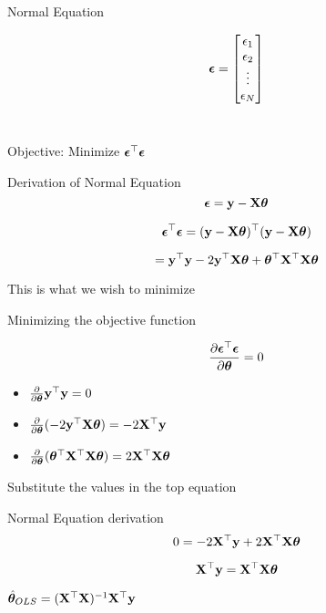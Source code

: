 \documentclass{beamer}
\begin{document}
\begin{frame}{Normal Equation}
    
\begin{equation*}
 \boldsymbol{\epsilon} = 
\begin{bmatrix}
    \epsilon_{1} \\
    \epsilon_{2} \\
    \vdots \\
    \epsilon_{N} \\
\end{bmatrix}
\end{equation*}
\\
\begin{center}
 \pause Objective:   Minimize $\boldsymbol{\epsilon}^\top\boldsymbol{\epsilon}$    
\end{center}
\end{frame}

\begin{frame}{Derivation of Normal Equation}
$$\boldsymbol{\epsilon} = \mathbf{y} - \mathbf{X}\boldsymbol{\theta}$$

$$\boldsymbol{\epsilon}^\top\boldsymbol{\epsilon} = (\mathbf{y} - \mathbf{X}\boldsymbol{\theta})^\top(\mathbf{y} - \mathbf{X}\boldsymbol{\theta})$$

$$= \mathbf{y}^\top\mathbf{y} - 2\mathbf{y}^\top\mathbf{X}\boldsymbol{\theta} + \boldsymbol{\theta}^\top\mathbf{X}^\top\mathbf{X}\boldsymbol{\theta}$$

This is what we wish to minimize
\end{frame}

\begin{frame}{Minimizing the objective function}
    
    
    $$\frac{\partial \boldsymbol{\epsilon}^\top \boldsymbol{\epsilon}}{\partial \boldsymbol{\theta}} = 0$$
    
    
    
    \begin{itemize}
        \item $\frac{\partial }{\partial \boldsymbol{\theta}} \mathbf{y}^\top\mathbf{y} = 0$
        \item $\frac{\partial }{\partial \boldsymbol{\theta}}(-2\mathbf{y}^\top\mathbf{X}\boldsymbol{\theta} ) = -2\mathbf{X}^\top\mathbf{y}$
        \item $\frac{\partial}{\partial\boldsymbol{\theta}} (\boldsymbol{\theta}^\top\mathbf{X}^\top\mathbf{X}\boldsymbol{\theta}) = 2\mathbf{X}^\top\mathbf{X}\boldsymbol{\theta}$
    \end{itemize}
    
    Substitute the values in the top equation
    
\end{frame}

\begin{frame}{Normal Equation derivation}
$$
    0 = -2\mathbf{X}^\top\mathbf{y} + 2\mathbf{X}^\top\mathbf{X}\boldsymbol{\theta}
$$

$$
    \mathbf{X}^\top\mathbf{y}  = \mathbf{X}^\top\mathbf{X}\boldsymbol{\theta}
$$

\begin{tcolorbox}
\begin{center}
        $\hat{\boldsymbol{\theta}}_{OLS} = (\mathbf{X}^\top\mathbf{X})^{-1}\mathbf{X}^\top\mathbf{y}$
\end{center}
\end{tcolorbox}

\end{frame}
\end{document}
